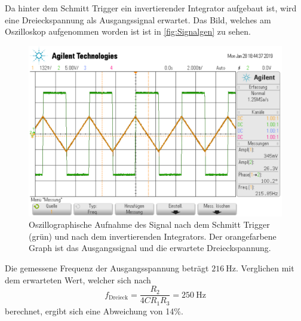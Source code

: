 Da hinter dem Schmitt Trigger ein invertierender Integrator aufgebaut ist, wird eine Dreieckspannung
als Ausgangssignal erwartet.
Das Bild, welches am Oszilloskop aufgenommen worden ist ist in \autoref{fig:Signalgen}
zu sehen.
\begin{figure}
    \centering
    \includegraphics[width=0.7\linewidth]{data_of_others_cuz_ours_suck/Signal/Bildschirmfoto vom 2022-02-11 13-19-10.png}
    \caption{Oszillographische Aufnahme des Signal nach dem Schmitt Trigger (grün) und 
    nach dem invertierenden Integrators. Der orangefarbene Graph ist das Ausgangssignal und die erwartete
    Dreieckspannung.}
    \label{fig:Signalgen}
\end{figure}
\FloatBarrier

Die gemessene Frequenz der Ausgangsspannung beträgt $\SI{216}{\hertz}$.
Verglichen mit dem erwarteten Wert, welcher sich nach
\begin{equation}
    f_\text{Dreieck} =  \frac{R_2}{4 C R_1 R_3} = \SI{250}{\hertz}
\end{equation}
berechnet, ergibt sich eine Abweichung von 14\%.

%
